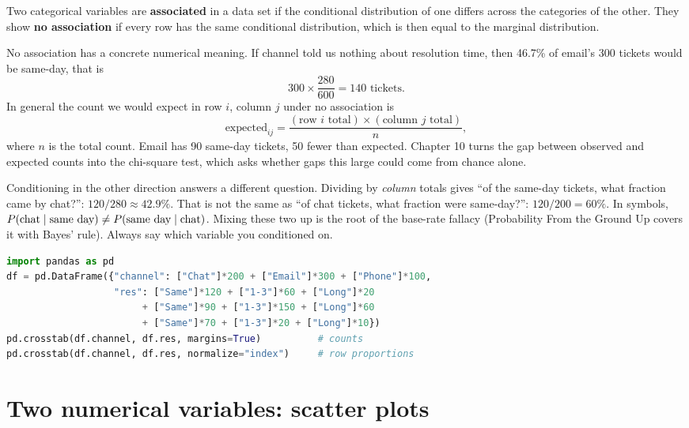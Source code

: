\begin{definition}
Two categorical variables are \textbf{associated} in a data set if the conditional
distribution of one differs across the categories of the other. They show
\textbf{no association} if every row has the same conditional distribution, which
is then equal to the marginal distribution.
\end{definition}

No association has a concrete numerical meaning. If channel told us nothing about
resolution time, then 46.7\% of email's 300 tickets would be same-day, that is
\[
  300 \times \frac{280}{600} = 140 \text{ tickets}.
\]
In general the count we would expect in row $i$, column $j$ under no association is
\[
  \text{expected}_{ij} = \frac{(\text{row } i \text{ total})\times(\text{column } j \text{ total})}{n},
\]
where $n$ is the total count.
Email has 90 same-day tickets, 50 fewer than expected. Chapter 10 turns
the gap between observed and expected counts into the chi-square test, which asks
whether gaps this large could come from chance alone.

\begin{trapbox}
Conditioning in the other direction answers a different question. Dividing by
\emph{column} totals gives ``of the same-day tickets, what fraction came by
chat?'': $120/280 \approx 42.9\%$. That is not the same as ``of chat tickets,
what fraction were same-day?'': $120/200 = 60\%$. In symbols, $P(\text{chat} \mid
\text{same day}) \ne P(\text{same day} \mid \text{chat})$. Mixing these two up is
the root of the base-rate fallacy (Probability From the Ground Up covers it with
Bayes' rule). Always say which variable you conditioned on.
\end{trapbox}

\begin{lstlisting}[language=Python]
import pandas as pd
df = pd.DataFrame({"channel": ["Chat"]*200 + ["Email"]*300 + ["Phone"]*100,
                   "res": ["Same"]*120 + ["1-3"]*60 + ["Long"]*20
                        + ["Same"]*90 + ["1-3"]*150 + ["Long"]*60
                        + ["Same"]*70 + ["1-3"]*20 + ["Long"]*10})
pd.crosstab(df.channel, df.res, margins=True)          # counts
pd.crosstab(df.channel, df.res, normalize="index")     # row proportions
\end{lstlisting}

\section{Two numerical variables: scatter plots}
\label{sec:corr-scatter}

